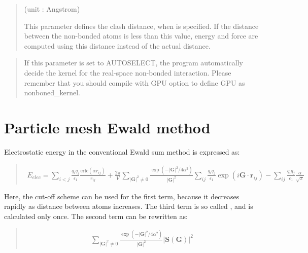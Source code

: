 \documentclass[a4paper,11pt,oneside,english]{sphinxmanual}
\begin{document}
 
\begin{quote}

 (unit : Angstrom)

This parameter defines the clash distance, when  is specified.
If the distance between the non-bonded atoms is less than this value,
energy and force are computed using this distance instead of the actual distance.
\end{quote}

  
\begin{quote}


If this parameter is set to AUTOSELECT, the program automatically decide the kernel
for the real-space non-bonded interaction. Please remember that you should compile with GPU
option to define GPU as nonboned\_kernel.
\end{quote}


\section{Particle mesh Ewald method}
\label{\detokenize{05_Energy:particle-mesh-ewald-method}}
Electrostatic energy in the conventional Ewald sum method is expressed as:
\begin{quote}

\vspace{-5mm}
\begin{equation*}
\begin{split}E_{elec}=\sum_{i<j}\frac{q_i q_j}{\epsilon_1} \frac{\text{erfc}(\alpha r_{ij})}{r_{ij}}+\frac{2\pi}{V}\sum_{{\left|\mathbf{G}\right|}^2\ne 0}\frac{\exp(-{\left|\mathbf{G}\right|}^2/4\alpha^2)}{\left|\mathbf{G}\right|^2}\sum_{ij}\frac{q_i q_j}{\epsilon_1}\exp(i{\mathbf{G}} \cdot \mathbf{r}_{ij})-\sum_{ij}\frac{q_i q_j}{\epsilon_1}\frac{\alpha}{\sqrt{\pi}}\end{split}
\end{equation*}
\vspace{-3mm}
\end{quote}

Here, the cut-off scheme can be used for the first term, because it decreases
rapidly as distance between atoms increases. The third term is so called
, and is calculated only once. The second term can be rewritten as:
\begin{quote}

\vspace{-5mm}
\begin{equation*}
\begin{split}\sum_{{\left|\mathbf{G}\right|}^2\ne 0}\frac{\exp(-{\left|\mathbf{G}\right|}^2/4\alpha^2)}{\left|\mathbf{G}\right|^2} {\left|\mathbf{S}(\mathbf{G})\right|}^2\end{split}
\end{equation*}
\vspace{-3mm}
\end{quote}
\end{document}
